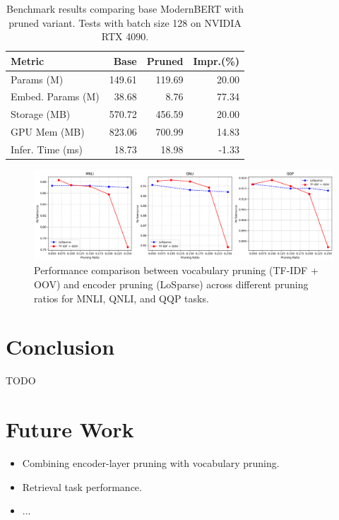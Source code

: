 \documentclass[twocolumn]{article}
\begin{document}
\begin{table}[htb]
\centering
\scriptsize
\setlength{\tabcolsep}{3pt}
\begin{tabular}{lrrr}
\toprule
\textbf{Metric} & \textbf{Base} & \textbf{Pruned} & \textbf{Impr.(\%)} \\
\midrule
Params (M) & 149.61 & 119.69 & 20.00 \\
Embed. Params (M) & 38.68 & 8.76 & 77.34 \\
Storage (MB) & 570.72 & 456.59 & 20.00 \\
GPU Mem (MB) & 823.06 & 700.99 & 14.83 \\
Infer. Time (ms) & 18.73 & 18.98 & -1.33 \\
\bottomrule
\end{tabular}
\caption{Benchmark results comparing base ModernBERT with pruned variant. Tests with batch size 128 on NVIDIA RTX 4090.}
\label{tab:benchmark_results}
\end{table}

\begin{figure}[t]
    \centering
    \includegraphics[width=\linewidth]{images/pruning_ratios.png}
    \caption{Performance comparison between vocabulary pruning (TF-IDF + OOV) and encoder pruning (LoSparse) across different pruning ratios for MNLI, QNLI, and QQP tasks. }
    \label{fig:pruning_ratio}
\end{figure}

\section{Conclusion}
TODO

\section{Future Work}
\begin{itemize}
    \item Combining encoder-layer pruning with vocabulary pruning.
    \item Retrieval task performance.
    \item ...
\end{itemize}
\newpage


\end{document}
